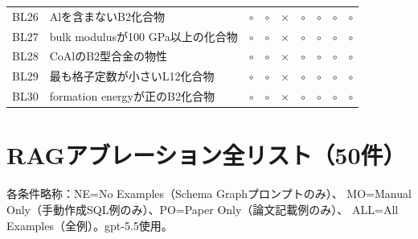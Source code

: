 \documentclass[3p]{elsarticle}
\begin{document}
\begin{longtable}{lp{5cm}ccccccc}
  BL26 & Alを含まないB2化合物 & $\circ$ & $\circ$ & $\times$ & $\circ$ & $\circ$ & $\circ$ & $\circ$ \\
  BL27 & bulk modulusが100 GPa以上の化合物 & $\circ$ & $\circ$ & $\times$ & $\circ$ & $\circ$ & $\circ$ & $\circ$ \\
  BL28 & CoAlのB2型合金の物性 & $\circ$ & $\circ$ & $\times$ & $\circ$ & $\circ$ & $\circ$ & $\circ$ \\
  BL29 & 最も格子定数が小さいL12化合物 & $\circ$ & $\circ$ & $\times$ & $\circ$ & $\circ$ & $\circ$ & $\circ$ \\
  BL30 & formation energyが正のB2化合物 & $\circ$ & $\circ$ & $\times$ & $\circ$ & $\circ$ & $\circ$ & $\circ$ \\
\end{longtable}
\newpage

\section{RAGアブレーション全リスト（50件）}
\label{sup:rag}

各条件略称：NE=No Examples（Schema Graphプロンプトのみ）、
MO=Manual Only（手動作成SQL例のみ）、PO=Paper Only（論文記載例のみ）、
ALL=All Examples（全例）。gpt-5.5使用。
\end{document}
